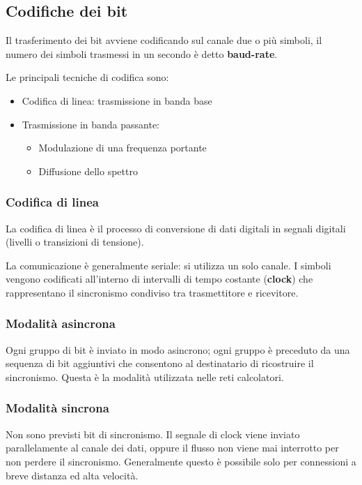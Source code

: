     \subsection{Codifiche dei bit}
        Il trasferimento dei bit avviene codificando sul canale due o più simboli, il numero dei simboli trasmessi in un secondo è detto \textbf{baud-rate}.

        Le principali tecniche di codifica sono:
        \begin{itemize}
            \item Codifica di linea: trasmissione in banda base
            \item Trasmissione in banda passante:
                \begin{itemize}
                    \item Modulazione di una frequenza portante
                    \item Diffusione dello spettro
                \end{itemize}
        \end{itemize}

        \subsubsection{Codifica di linea}
            La codifica di linea è il processo di conversione di dati digitali in segnali digitali (livelli o transizioni di tensione).
        
            La comunicazione è generalmente seriale: si utilizza un solo canale. I simboli vengono codificati all'interno di intervalli di tempo costante (\textbf{clock}) che rappresentano il sincronismo condiviso tra trasmettitore e ricevitore.

            \subsubsection*{Modalità asincrona}
            Ogni gruppo di bit è inviato in modo asincrono; ogni gruppo è preceduto da una sequenza di bit aggiuntivi che consentono al destinatario di ricostruire il sincronismo. Questa è la modalità utilizzata nelle reti calcolatori.

            \subsubsection*{Modalità sincrona}
            Non sono previsti bit di sincronismo. Il segnale di clock viene inviato parallelamente al canale dei dati, oppure il flusso non viene mai interrotto per non perdere il sincronismo. Generalmente questo è possibile solo per connessioni a breve distanza ed alta velocità.

